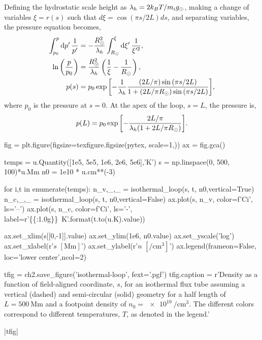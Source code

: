 Defining the hydrostatic scale height as $\lambda_h=2k_BT/m_ig_\odot$, making a change of variables $\xi=r(s)$ such that $d\xi=\cos{(\pi s / 2L)}ds$, and separating variables, the pressure equation becomes,
\begin{align}
    \int_{p_0}^p\textup{d}p^\prime\,\frac{1}{p^\prime} &= -\frac{R_\odot^2}{\lambda_h}\int_{R_\odot}^\xi\textup{d}\xi^\prime\,\frac{1}{\xi^{\prime2}},\nonumber \\
    \ln\left(\frac{p}{p_0}\right) &= \frac{R_\odot^2}{\lambda_h}\left(\frac{1}{\xi} - \frac{1}{R_\odot}\right),\nonumber \\
    p(s) &= p_0\exp{\left[-\frac{1}{\lambda_h}\frac{(2L/\pi)\sin{(\pi s/2L)}}{1 + (2L/\pi R_\odot)\sin{(\pi s/2L)}}\right]}, \label{eq:isothermal_pressure}
\end{align}
where $p_0$ is the pressure at $s=0$. At the apex of the loop, $s=L$, the pressure is,
\begin{equation*}
    p(L) = p_0\exp{\left[-\frac{2L/\pi}{\lambda_h(1 + 2L/\pi R_\odot)}\right]}.
\end{equation*}

\begin{pycode}[chapter2]
fig = plt.figure(figsize=texfigure.figsize(pytex, scale=1,))
ax = fig.gca()

temps = u.Quantity([1e5, 5e5, 1e6, 2e6, 5e6],'K')
s = np.linspace(0, 500, 100)*u.Mm
n0 = 1e10 * u.cm**(-3)

for i,t in enumerate(temps):
    n_v,_,_ = isothermal_loop(s, t, n0,vertical=True)
    n_c,_,_ = isothermal_loop(s, t, n0,vertical=False)
    ax.plot(s, n_v, color=f'C{i}', ls='--')
    ax.plot(s, n_c, color=f'C{i}', ls='-',
            label=r'\SI{{{:1.0g}}}{{\kelvin}}'.format(t.to(u.K).value))

ax.set_xlim(s[[0,-1]].value)
ax.set_ylim(1e6, n0.value)
ax.set_yscale('log')
ax.set_xlabel(r'$s$ $[\si{\mega\m}]$')
ax.set_ylabel(r'$n$ $[\si{\per\cubic\cm}]$')
ax.legend(frameon=False, loc='lower center',ncol=2)

tfig = ch2.save_figure('isothermal-loop', fext='.pgf')
tfig.caption = r'Density as a function of field-aligned coordinate, $s$, for an isothermal flux tube assuming a vertical (dashed) and semi-circular (solid) geometry for a half length of $L=\SI{500}{\mega\m}$ and a footpoint density of $n_0=\SI{e10}{\per\cubic\cm}$. The different colors correspond to different temperatures, $T$, as denoted in the legend.'
\end{pycode}
\py[chapter2]|tfig|

